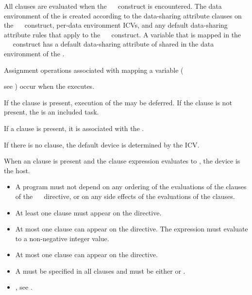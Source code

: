 All clauses are evaluated when the ~~ construct is encountered.  The data environment of the  is created according to the data-sharing attribute clauses on the ~~ construct, per-data environment ICVs, and any default data-sharing attribute rules that apply to the ~~ construct.  A variable that is mapped in the ~~ construct has a default data-sharing attribute of shared in the data environment of the .

Assignment operations associated with mapping a variable ({see ) occur when the  executes.

If the  clause is present, execution of the  may be deferred.  If the  clause is not present, the  is an included task.

If a  clause is present, it is associated with the .

If there is no  clause, the default device is determined by the  ICV.

When an  clause is present and the  clause expression evaluates to , the device is the host. 

\restrictions
\begin{itemize}
\item A program must not depend on any ordering of the evaluations of the clauses of the ~~ directive, or on any side effects of the evaluations of the clauses.
\item At least one  clause must appear on the directive.
\item At most one  clause can appear on the directive. The  expression must evaluate to a non-negative integer value.
\item At most one  clause can appear on the directive.
\item A  must be specified in all  clauses and must be either  or .
\end{itemize}

\crossreferences
\begin{itemize}
\item {}, see .


\end{itemize}}
